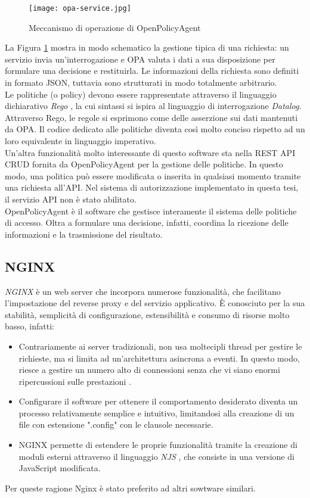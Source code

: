 \begin{figure}[h]
    \texttt{[image: opa-service.jpg]}
    \centering
    \caption{Meccanismo di operazione di OpenPolicyAgent}
    \label{OPAWork}
\end{figure} 
La Figura \ref*{OPAWork} mostra in modo schematico la gestione tipica di una richiesta: un servizio invia un'interrogazione
 e OPA valuta i dati a sua disposizione per formulare una decisione e restituirla. 
Le informazioni della richiesta sono definiti in formato JSON, tuttavia sono strutturati in modo totalmente arbitrario. 
\\ Le politiche (o policy) devono essere rappresentate attraverso il linguaggio dichiarativo 
\textit{Rego} \cite{rego_doc}, la cui sintassi si ispira al linguaggio 
di interrogazione \textit{Datalog}. 
Attraverso Rego, le regole si esprimono come delle asserzione sui dati mantenuti da OPA.
Il codice dedicato alle politiche diventa così molto conciso rispetto ad un loro equivalente in 
linguaggio imperativo. 
\\ Un'altra funzionalità molto interessante di questo software sta nella REST API CRUD fornita da OpenPolicyAgent per la gestione delle politiche. In questo modo, una politica può essere modificata o inserita 
in qualsiasi momento tramite una richiesta all'API. Nel sistema di autorizzazione implementato in questa tesi, il servizio API non è stato abilitato. 
\\ OpenPolicyAgent è il software che gestisce interamente il sistema delle politiche di accesso. Oltra a formulare una decisione,
 infatti, coordina la ricezione delle informazioni e la trasmissione del risultato.  


\subsection{NGINX}
\textit{NGINX} \cite{nginx_bib} è un web server che incorpora numerose funzionalità, che facilitano l'impostazione del reverse proxy e del servizio applicativo. 
È conosciuto per la sua stabilità, semplicità di configurazione, estensibilità e consumo di risorse molto basso, infatti:
\begin{itemize}
    \item 
    Contrariamente ai server tradizionali,  
    non usa moltecipli thread per gestire le richieste, ma si limita ad un'architettura asincrona a eventi. 
    In questo modo, riesce a gestire un numero alto di connessioni senza che vi siano enormi ripercussioni sulle prestazioni \cite{nginx_doc}. 
    
    \item Configurare il software per ottenere il comportamento desiderato diventa un processo relativamente semplice e intuitivo, limitandosi
    alla creazione di un file con estensione ".config" con le clausole necessarie. 
    \item NGINX permette di estendere le proprie funzionalità tramite la creazione di moduli esterni attraverso il linguaggio \textit{NJS} \cite{njs_doc}, 
    che consiste in una versione di JavaScript modificata. 
\end{itemize}
Per queste ragione Nginx è stato preferito ad altri sowtware similari.

